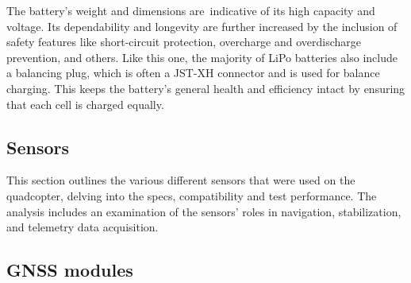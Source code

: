 \documentclass{article}
\begin{document}
The battery's weight and dimensions are indicative of its high capacity and voltage. Its dependability and longevity are further increased by the inclusion of safety features like short-circuit protection, overcharge and overdischarge prevention, and others. Like this one, the majority of LiPo batteries also include a balancing plug, which is 
often a JST-XH connector and is used for balance charging. This keeps the battery's general health and efficiency intact by ensuring that each cell is charged equally.

\subsection{Sensors}
This section outlines the various different sensors that were used on the quadcopter, delving into the specs, compatibility and test performance. The analysis includes an examination of the sensors' roles in navigation, stabilization, and telemetry data acquisition.

\subsection*{GNSS modules}
\end{document}

